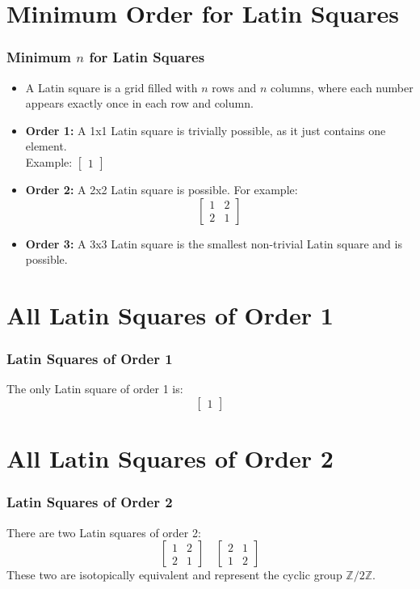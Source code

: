 \documentclass{beamer}
\begin{document}
\section{Minimum Order for Latin Squares}
\begin{frame}
\frametitle{Minimum \( n \) for Latin Squares}
\begin{itemize}
  \item A Latin square is a grid filled with \( n \) rows and \( n \) columns, where each number appears exactly once in each row and column.
  \item \textbf{Order 1:} A 1x1 Latin square is trivially possible, as it just contains one element.\\
    Example: \(\begin{bmatrix} 1 \end{bmatrix}\)
  \item \textbf{Order 2:} A 2x2 Latin square is possible. For example:
  \[
  \begin{bmatrix}
  1 & 2 \\
  2 & 1
  \end{bmatrix}
  \]
  \item \textbf{Order 3:} A 3x3 Latin square is the smallest non-trivial Latin square and is possible.
\end{itemize}
\end{frame}

\section{All Latin Squares of Order 1}
\begin{frame}
\frametitle{Latin Squares of Order 1}
The only Latin square of order 1 is:
\[ 
\begin{bmatrix} 
1 
\end{bmatrix} 
\]
\end{frame}

\section{All Latin Squares of Order 2}
\begin{frame}
\frametitle{Latin Squares of Order 2}
There are two Latin squares of order 2:
\[
\begin{bmatrix}
1 & 2 \\
2 & 1
\end{bmatrix}
\quad
\begin{bmatrix}
2 & 1 \\
1 & 2
\end{bmatrix}
\]
These two are isotopically equivalent and represent the cyclic group \( \mathbb{Z}/2\mathbb{Z} \).
\end{frame}
\end{document}
